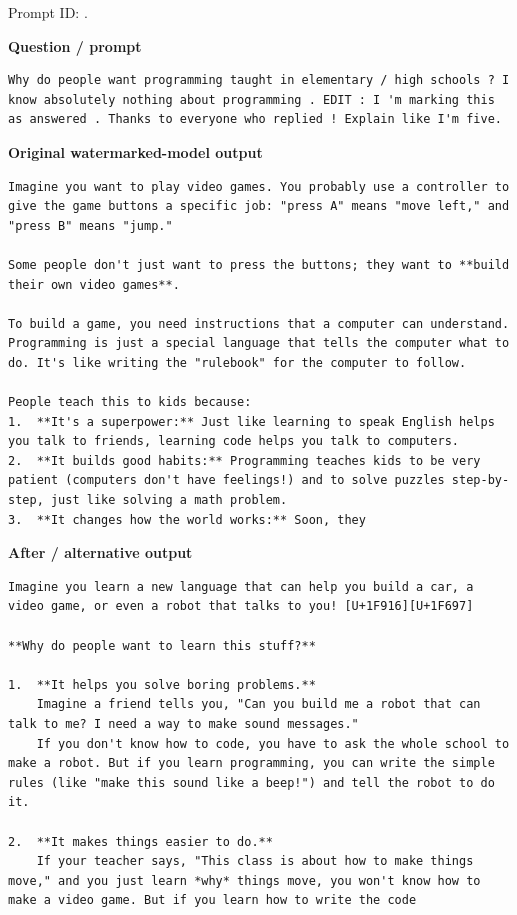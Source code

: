 Prompt ID:
\texttt{}.

\textbf{Question / prompt}

\begin{Verbatim}
Why do people want programming taught in elementary / high schools ? I know absolutely nothing about programming . EDIT : I 'm marking this as answered . Thanks to everyone who replied ! Explain like I'm five.
\end{Verbatim}

\textbf{Original watermarked-model output}

\begin{Verbatim}
Imagine you want to play video games. You probably use a controller to give the game buttons a specific job: "press A" means "move left," and "press B" means "jump."

Some people don't just want to press the buttons; they want to **build their own video games**.

To build a game, you need instructions that a computer can understand. Programming is just a special language that tells the computer what to do. It's like writing the "rulebook" for the computer to follow.

People teach this to kids because:
1.  **It's a superpower:** Just like learning to speak English helps you talk to friends, learning code helps you talk to computers.
2.  **It builds good habits:** Programming teaches kids to be very patient (computers don't have feelings!) and to solve puzzles step-by-step, just like solving a math problem.
3.  **It changes how the world works:** Soon, they
\end{Verbatim}

\textbf{After / alternative output}

\begin{Verbatim}
Imagine you learn a new language that can help you build a car, a video game, or even a robot that talks to you! [U+1F916][U+1F697]

**Why do people want to learn this stuff?**

1.  **It helps you solve boring problems.**
    Imagine a friend tells you, "Can you build me a robot that can talk to me? I need a way to make sound messages."
    If you don't know how to code, you have to ask the whole school to make a robot. But if you learn programming, you can write the simple rules (like "make this sound like a beep!") and tell the robot to do it.

2.  **It makes things easier to do.**
    If your teacher says, "This class is about how to make things move," and you just learn *why* things move, you won't know how to make a video game. But if you learn how to write the code
\end{Verbatim}


